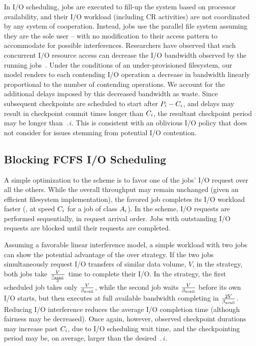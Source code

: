 In \nocoop I/O scheduling, jobs are executed to fill-up the system based on processor
availability, and their I/O workload (including CR activities) are not coordinated by
any system of cooperation.  Instead, jobs use the parallel file system
assuming they are the sole user -- with no modification to their access pattern to
accommodate for possible interferences. Researchers have observed that such
concurrent I/O resource access can decrease the I/O bandwidth observed by the running
jobs~\cite{Dorier2015}.  Under the conditions of an under-provisioned filesystem, our
model renders to each contending I/O operation a decrease in bandwidth linearly
proportional to the number of contending operations.  We account for the additional
delays imposed by this decreased bandwidth as waste. Since subsequent checkpoints are
scheduled to start after $P_{i}-C_{i}$, and delays may result in checkpoint
commit times longer than $C_{i}$, the resultant checkpoint period may be longer
than $\period{i}$. This is consistent with an oblivious I/O policy that does not
consider for issues stemming from potential I/O contention.


\subsection{Blocking \fifoblock FCFS I/O Scheduling}
\label{sec:fcfsblock}

A simple optimization to the \nocoop scheme is to favor one of the jobs' I/O request
over all the others. While the overall throughput may remain unchanged (given an
efficient filesystem implementation), the favored job completes its I/O
workload faster (\ie, at speed $C_{i}$ for a job of class $A_{i}$).  In
the \fifoblock scheme, I/O requests are performed sequentially, in request arrival
order. Jobs with outstanding I/O requests are blocked until their requests are
completed.

Assuming a favorable linear interference model, a simple workload with two jobs can
show the potential advantage of the \fifoblock over \nocoop strategy.  If the two
jobs simultaneously request I/O transfers of similar data volume, $V$, in the \nocoop
strategy, both jobs take $\frac{V}{\frac{\beta_{\text{avail}}}{2}}$ time to complete their I/O.
In the \fifoblock strategy, the first scheduled job takes only
$\frac{V}{\beta_{\text{avail}}}$, while the second job waits $\frac{V}{\beta_{\text{avail}}}$
before its own I/O starts, but then executes at full available bandwidth completing
in $\frac{2V}{\beta_{\text{avail}}}$.  Reducing I/O interference reduces the average I/O
completion time (although fairness may be decreased).  Once again, however, observed
checkpoint durations may increase past $C_{i}$, due to I/O scheduling wait time,
and the checkpointing period may be, on average, larger than the desired
$\period{i}$.


